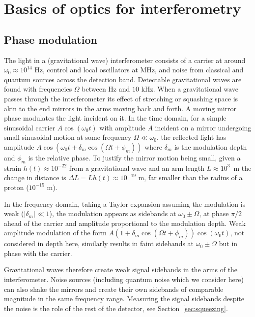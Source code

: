 \documentclass[aps,pra,superscriptaddress,reprint,nofootinbib]{revtex4-1}
\newcommand{\abs}[1]{\left\lvert #1 \right\rvert}
\begin{document}
\section{Basics of optics for interferometry}
\label{sec:basics}

\subsection{Phase modulation}

The light in a (gravitational wave) interferometer consists of a carrier at around $\omega_0 \approx 10^{14}$ Hz, control and local oscillators at MHz, and noise from classical and quantum sources across the detection band. Detectable gravitational waves are found with frequencies $\Omega$ between Hz and $10$ kHz. When a gravitational wave passes through the interferometer its effect of stretching or squashing space is akin to the end mirrors in the arms moving back and forth. A moving mirror phase modulates the light incident on it. In the time domain, for a simple sinusoidal carrier $A \cos(\omega_0 t)$ with amplitude $A$ incident on a mirror undergoing small sinusoidal motion at some frequency $\Omega \ll \omega_0$, the reflected light has amplitude $A \cos(\omega_0 t + \delta_m \cos(\Omega t + \phi_m))$ where $\delta_m$ is the modulation depth and $\phi_m$ is the relative phase. To justify the mirror motion being small, given a strain $h(t) \approx 10^{-22}$ from a gravitational wave and an arm length $L \approx 10^3$~m the change in distance is $\Delta L = L h(t) \approx 10^{-19}$ m, far smaller than the radius of a proton ($10^{-15}$ m).


In the frequency domain, taking a Taylor expansion assuming the modulation is weak ($\abs{\delta_m} \ll 1$), the modulation appears as sidebands at $\omega_0 \pm \Omega$, at phase $\pi/2$ ahead of the carrier and amplitude proportional to the modulation depth.
Weak amplitude modulation of the form $A (1 + \delta_m \cos(\Omega t + \phi_m)) \cos(\omega_0 t)$, not considered in depth here, similarly results in faint sidebands at $\omega_0 \pm \Omega$ but in phase with the carrier.


Gravitational waves therefore create weak signal sidebands in the arms of the interferometer. Noise sources (including quantum noise which we consider here) can also shake the mirrors and create their own sidebands of comparable magnitude in the same frequency range. Measuring the signal sidebands despite the noise is the role of the rest of the detector, see Section~\ref{sec:squeezing}.
\end{document}
